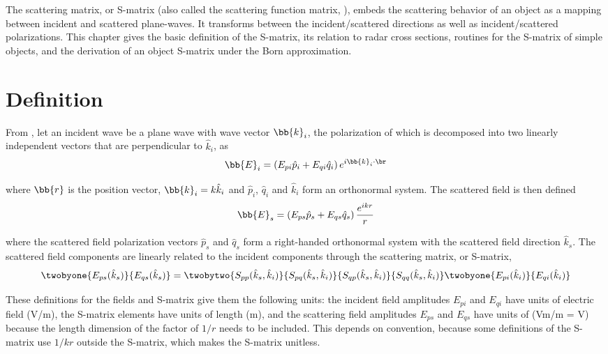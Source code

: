 
The scattering matrix, or S-matrix (also called the scattering function matrix, \cite{tsang2000scattering}), embeds the scattering behavior of an object as a mapping between incident and scattered plane-waves. It transforms between the incident/scattered directions as well as incident/scattered polarizations. This chapter gives the basic definition of the S-matrix, its relation to radar cross sections, routines for the S-matrix of simple objects, and the derivation of an object S-matrix under the Born approximation. 

\section{Definition}

From \cite{tsang2000scattering}, let an incident wave be a plane wave with wave vector $\bb{k}_i$, the polarization of which is decomposed into two linearly independent vectors that are perpendicular to $\hat{k}_i$, as
\begin{equation}
\bb{E}_i = \left( E_{pi} \hat{p}_i+  E_{qi}\hat{q}_i\right) e^{i\bb{k}_i \cdot \br}
\end{equation}

\noindent where $\bb{r}$ is the position vector, ${\bb{k}}_i = k\hat{{k}}_i$ and $\hat{p}_i$, $\hat{q}_i$ and $\hat{{k}}_i$ form an orthonormal system.  The scattered field is then defined 
\begin{equation}
\bb{E}_s = \left( E_{ps}\hat{p}_s +  E_{qs}\hat{q}_s\right) \dfrac{ e^{i k r}}{r}
\end{equation}

\noindent where the scattered field polarization vectors $\hat{p}_s$ and $\hat{q}_s$ form a right-handed orthonormal system with the scattered field direction $\hat{{k}}_s$. The scattered field components are linearly related to the incident components through the scattering matrix, or S-matrix, 
\begin{equation}
\twobyone{E_{ps}(\hat{k}_s)}{E_{qs}(\hat{k}_s)} = \twobytwo{S_{pp}(\hat{k}_s,\hat{k}_i)   }{S_{pq}(\hat{k}_s,\hat{k}_i) }{S_{qp}(\hat{k}_s,\hat{k}_i) }{S_{qq}(\hat{k}_s,\hat{k}_i) }   \twobyone{E_{pi}(\hat{k}_i)}{E_{qi}(\hat{k}_i)} 
\end{equation}
 
These definitions for the fields and S-matrix give them the following units: the incident field amplitudes $E_{pi}$ and $E_{qi}$ have units of electric field (V/m), the S-matrix elements have units of length (m), and the scattering field amplitudes $E_{ps}$ and $E_{qs}$ have units of (Vm/m = V) because the length dimension of the factor of $1/r$ needs to be included. This depends on convention, because some definitions of the S-matrix use $1/kr$ outside the S-matrix, which makes the S-matrix unitless. 

